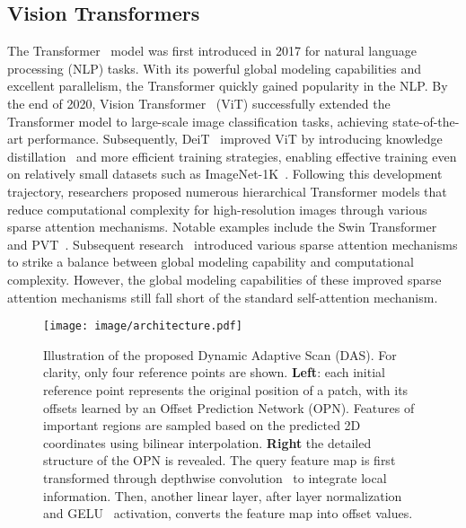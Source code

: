 \subsection{Vision Transformers}
The Transformer~\cite{transfomer} model was first introduced in 2017 for natural language processing (NLP) tasks. With its powerful global modeling capabilities and excellent parallelism, the Transformer quickly gained popularity in the NLP. By the end of 2020, Vision Transformer~\cite{vit} (ViT) successfully extended the Transformer model to large-scale image classification tasks, achieving state-of-the-art performance. Subsequently, DeiT~\cite{deit} improved ViT by introducing knowledge distillation~\cite{knowledgedistilling} and more efficient training strategies, enabling effective training even on relatively small datasets such as ImageNet-1K~\cite{imagenet}. Following this development trajectory, researchers proposed numerous hierarchical Transformer models that reduce computational complexity for high-resolution images through various sparse attention mechanisms. Notable examples include the Swin Transformer~\cite{swin} and PVT~\cite{pvt,pvtv2}. Subsequent research~\cite{pvt,pvtv2,dat,cswin,biformer,dilateformer,qformer,transnext} introduced various sparse attention mechanisms to strike a balance between global modeling capability and computational complexity. However, the global modeling capabilities of these improved sparse attention mechanisms still fall short of the standard self-attention mechanism.


\begin{figure*}[h]
    \centering
    \texttt{[image: image/architecture.pdf]}
    \vspace{-3mm}
    \caption{Illustration of the proposed Dynamic Adaptive Scan (DAS). For clarity, only four reference points are shown. \textbf{Left}: each initial reference point represents the original position of a patch, with its offsets learned by an Offset Prediction Network (OPN). Features of important regions are sampled based on the predicted 2D coordinates using bilinear interpolation. \textbf{Right} the detailed structure of the OPN is revealed. The query feature map is first transformed through depthwise convolution~\cite{depsconv,depsconv2} to integrate local information. Then, another linear layer, after layer normalization~\cite{layernorm} and GELU~\cite{gelu} activation, converts the feature map into offset values.}
    \label{fig:das}
    \vspace{-1em}
\end{figure*}
 
